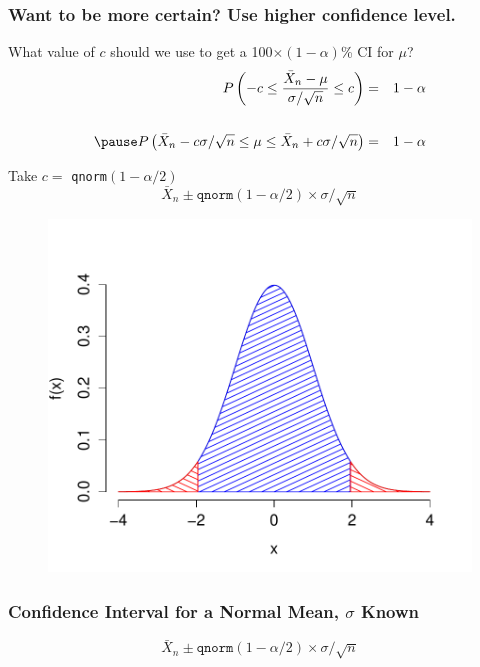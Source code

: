 \documentclass[handout]{beamer}
\begin{document}
\begin{frame}
\frametitle{Want to be more certain? Use higher confidence level.}
What value of $c$ should we use to get a 100$\times(1-\alpha)$\% CI for $\mu$?
	\begin{eqnarray*}
		P\left(-c \leq \frac{\bar{X}_n-\mu}{\sigma/\sqrt{n}} \leq c \right) &=& 1-\alpha \\ \\ \pause
		P\left(\bar{X}_n - c \sigma/\sqrt{n} \leq \mu\leq \bar{X}_n + c \sigma/\sqrt{n} \right) &=& 1-\alpha 
	\end{eqnarray*}
 \pause

\alert{Take $c =$ \texttt{qnorm}$(1-\alpha/2)$} \pause
	$$\bar{X}_n \pm \texttt{qnorm}(1-\alpha/2) \times \sigma/\sqrt{n}$$
\end{frame}
\begin{frame}
\begin{figure}
\centering
\includegraphics[scale = 0.6]{./images/normal_tails}
\end{figure}
\end{frame}
\begin{frame}
\frametitle{Confidence Interval for a Normal Mean, $\sigma$ Known}
\Large
$$\boxed{\bar{X}_n \pm \texttt{qnorm}(1-\alpha/2) \times \sigma/\sqrt{n}}$$
\end{frame}
\end{document}

